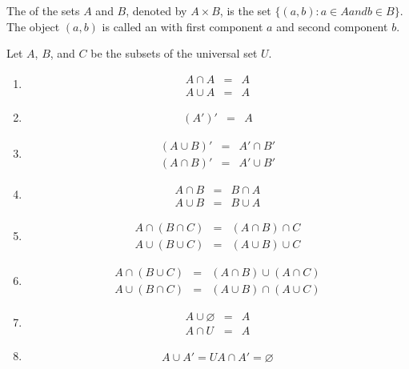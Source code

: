 \begin{definition}
  The  of the sets $A$ and $B$, denoted by $A \times B$, is the set $\{(a, b) : a \in A and b \in B \}$. The object $(a, b)$ is called an  with first component $a$ and second component $b$.
\end{definition}

\begin{theorem}
  Let $A$, $B$, and $C$ be the subsets of the universal set $U$.
  \begin{enumerate}[label=\textbf{(\alph*)}]
    \item {}
    \begin{eqnarray*}
    A \cap A & = & A\\
    A \cup A & = & A
    \end{eqnarray*}
    \item {}
    \begin{eqnarray*}
      (A')' & = & A
    \end{eqnarray*}
    \item {}
    \begin{eqnarray*}
      (A \cup B)' & = & A' \cap B'\\
      (A \cap B)' & = & A' \cup B'
    \end{eqnarray*}
    \item {}
    \begin{eqnarray*}
      A \cap B & = & B \cap A\\
      A \cup B & = & B \cup A
    \end{eqnarray*}
    \item {}
    \begin{eqnarray*}
      A \cap (B \cap C) & = & (A \cap B) \cap C\\
      A \cup (B \cup C) & = & (A \cup B) \cup C
    \end{eqnarray*}
    \item {}
    \begin{eqnarray*}
      A \cap (B \cup C) & = & (A \cap B) \cup (A \cap C)\\
      A \cup (B \cap C) & = & (A \cup B) \cap (A \cup C)
    \end{eqnarray*}
    \item {}
    \begin{eqnarray*}
      A \cup \varnothing & = & A\\
      A \cap U & = & A
    \end{eqnarray*}
    \item {}
    \begin{eqnarray*}
      A \cup A' = U
      A \cap A' = \varnothing
    \end{eqnarray*}    
  \end{enumerate}
\end{theorem}

